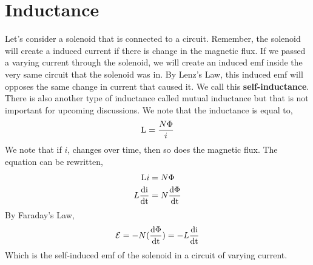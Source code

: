 \chapter{Inductance}
Let's consider a solenoid that is connected to a circuit. Remember, the solenoid will create a induced current if there is change in the magnetic flux. If we passed a varying current through the solenoid, we will create an induced emf inside the very same circuit that the solenoid was in. By Lenz's Law, this induced emf will opposes the same change in current that caused it. We call this \textbf{self-inductance}. There is also another type of inductance called mutual inductance but that is not important for upcoming discussions. We note that the inductance is equal to, 
\begin{equation*}
	\mathrm{L} = \frac{N\Phi}{i}
\end{equation*}
We note that if $i$, changes over time, then so does the magnetic flux. The equation can be rewritten,
\begin{align*}
	\mathrm{L}i &= N\Phi \\ 
	L\frac{\mathrm{d i}}{\mathrm{d t}} &= N\frac{\mathrm{d \Phi}}{\mathrm{d t}}
\end{align*}
By Faraday's Law, 
\begin{equation*}
	\mathcal{E} = - N(\frac{\mathrm{d \Phi}}{\mathrm{d t}}) = -L\frac{\mathrm{d i}}{\mathrm{d t}}
\end{equation*}
Which is the self-induced emf of the solenoid in a circuit of varying current. 

